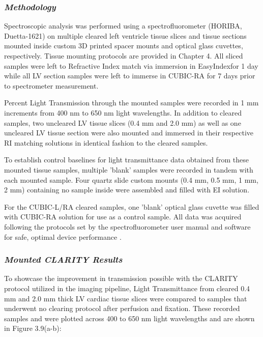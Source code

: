 \subsubsection{\textit{Methodology}}

Spectroscopic analysis was performed using a spectrofluorometer (HORIBA, Duetta-1621) on multiple cleared left ventricle tissue slices and tissue sections mounted inside custom 3D printed spacer mounts and optical glass cuvettes, respectively. Tissue mounting protocols are provided in Chapter 4. All sliced samples were left to Refractive Index match via immersion in EasyIndex\textrademark for 1 day while all LV section samples were left to immerse in CUBIC-RA for 7 days prior to spectrometer measurement. 

Percent Light Transmission through the mounted samples were recorded in 1 mm increments from 400 nm to 650 nm light wavelengths.  In addition to cleared samples, two uncleared LV tissue slices (0.4 mm and 2.0 mm) as well as one uncleared LV tissue section were also mounted and immersed in their respective RI matching solutions in identical fashion to the cleared samples. 

To establish control baselines for light transmittance data obtained from these mounted tissue samples, multiple 'blank' samples were recorded in tandem with each mounted sample. Four quartz slide custom mounts (0.4 mm, 0.5 mm, 1 mm, 2 mm) containing no sample inside were assembled and filled with EI solution. 

For the CUBIC-L/RA cleared samples, one 'blank' optical glass cuvette was filled with CUBIC-RA solution for use as a control sample. All data was acquired following the protocols set by the spectrofluorometer user manual and software for safe, optimal device performance \cite{noauthor_duetta_nodate}.

\subsubsection{\textit{Mounted CLARITY Results}}

To showcase the improvement in transmission possible with the CLARITY protocol utilized in the imaging pipeline, Light Transmittance from cleared 0.4 mm and 2.0 mm thick LV cardiac tissue slices were compared to samples that underwent no clearing protocol after perfusion and fixation. These recorded samples and were plotted across 400 to 650 nm light wavelengths and are shown in Figure 3.9(a-b):


